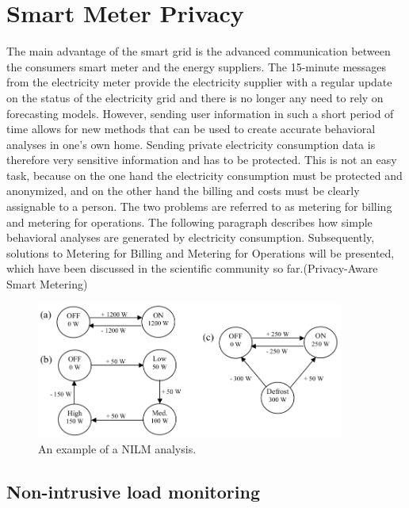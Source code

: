 \section{Smart Meter Privacy}
The main advantage of the smart grid is the advanced communication between the consumers smart meter and the energy suppliers. The 15-minute messages from the electricity meter provide the electricity supplier with a regular update on the status of the electricity grid and there is no longer any need to rely on forecasting models. However, sending user information in such a short period of time allows for new methods that can be used to create accurate behavioral analyses in one's own home. Sending private electricity consumption data is therefore very sensitive information and has to be protected. This is not an easy task, because on the one hand the electricity consumption must be protected and anonymized, and on the other hand the billing and costs must be clearly assignable to a person. The two problems are referred to as metering for billing and metering for operations. The following paragraph describes how simple behavioral analyses are generated by electricity consumption. Subsequently, solutions to Metering for Billing and Metering for Operations will be presented, which have been discussed in the scientific community so far.(Privacy-Aware Smart Metering) \begin{figure}[htbp!]
  \centering
  \includegraphics[width=0.9\textwidth]{images/Appliance_Model.png}
  \caption[Short description]{An example of a NILM analysis.}
  \label{fig:Appliance_Model}
\end{figure}
\subsection{Non-intrusive load monitoring} 


